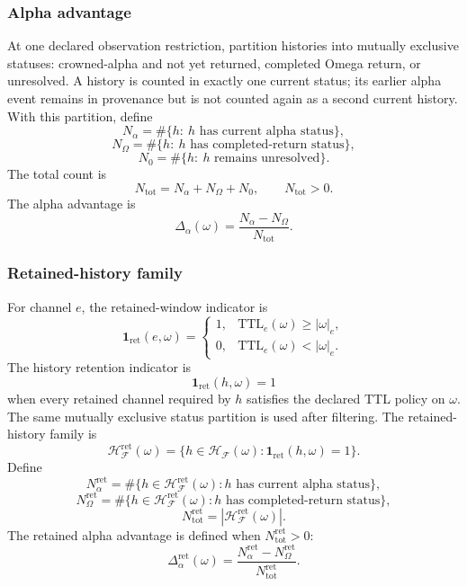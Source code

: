 \subsubsection{Alpha advantage}
\label{app:stoch-alpha-advantage}
At one declared observation restriction, partition histories into mutually
exclusive statuses: crowned-alpha and not yet returned, completed Omega
return, or unresolved. A history is counted in exactly one current status;
its earlier alpha event remains in provenance but is not counted again as a
second current history. With this partition, define
\[
N_\alpha=
\#\{h:\ h\text{ has current alpha status}\},
\]
\[
N_\Omega=
\#\{h:\ h\text{ has completed-return status}\},
\]
\[
N_0=
\#\{h:\ h\text{ remains unresolved}\}.
\]
The total count is
\[
N_{\mathrm{tot}}=N_\alpha+N_\Omega+N_0,
\qquad
N_{\mathrm{tot}}>0.
\]
The alpha advantage is
\begin{equation}
\Delta_\alpha(\omega)=
\frac{N_\alpha-N_\Omega}{N_{\mathrm{tot}}}.
\label{app:stochastic:eq:alpha-advantage}
\end{equation}

\subsubsection{Retained-history family}
\label{app:stoch-retained-history-family}
For channel \(e\), the retained-window indicator is
\[
\mathbf 1_{\mathrm{ret}}(e,\omega)=
\begin{cases}
1, & \mathrm{TTL}_e(\omega)\ge |\omega|_e,\\
0, & \mathrm{TTL}_e(\omega)< |\omega|_e.
\end{cases}
\]
The history retention indicator is
\[
\mathbf 1_{\mathrm{ret}}(h,\omega)=1
\]
when every retained channel required by \(h\) satisfies the declared TTL policy on \(\omega\). The same mutually exclusive status partition is used after filtering. The retained-history family is
\[
\mathcal H_{\mathcal F}^{\mathrm{ret}}(\omega)
=
\{h\in\mathcal H_{\mathcal F}(\omega):
\mathbf 1_{\mathrm{ret}}(h,\omega)=1\}.
\]
Define
\[
N_{\alpha}^{\mathrm{ret}}
=
\#\{h\in\mathcal H_{\mathcal F}^{\mathrm{ret}}(\omega):
h\text{ has current alpha status}\},
\]
\[
N_{\Omega}^{\mathrm{ret}}
=
\#\{h\in\mathcal H_{\mathcal F}^{\mathrm{ret}}(\omega):
h\text{ has completed-return status}\},
\]
\[
N_{\mathrm{tot}}^{\mathrm{ret}}
=
|\mathcal H_{\mathcal F}^{\mathrm{ret}}(\omega)|.
\]
The retained alpha advantage is defined when \(N_{\mathrm{tot}}^{\mathrm{ret}}>0\):
\begin{equation}
\Delta_{\alpha}^{\mathrm{ret}}(\omega)
=
\frac{N_{\alpha}^{\mathrm{ret}}-N_{\Omega}^{\mathrm{ret}}}{N_{\mathrm{tot}}^{\mathrm{ret}}}.
\label{app:stochastic:eq:ret-alpha-advantage}
\end{equation}

